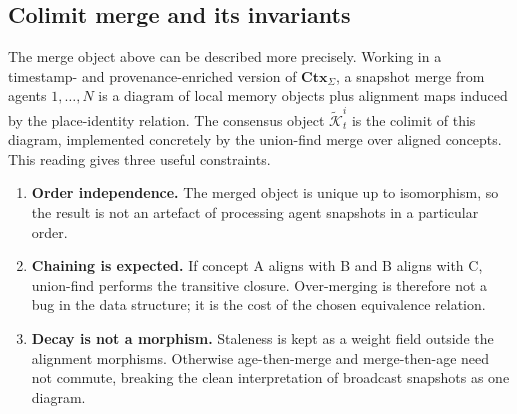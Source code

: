 \documentclass{article}
\begin{document}
\subsection{Colimit merge and its invariants}
\label{sec:colimit}

The merge object above can be described more precisely. Working in a
timestamp- and provenance-enriched version of $\mathbf{Ctx}_\Sigma$, a
snapshot merge from agents $1,\dots,N$ is a diagram of local memory
objects plus alignment maps induced by the place-identity relation. The
consensus object $\widetilde{\mathcal{K}}_t^i$ is the colimit of this
diagram, implemented concretely by the union-find merge over aligned
concepts. This reading gives three useful constraints.
\begin{enumerate}[leftmargin=20pt,itemsep=2pt,topsep=2pt]
\item \textbf{Order independence.} The merged object is unique up to isomorphism, so the result is not an artefact of processing agent snapshots in a particular order.
\item \textbf{Chaining is expected.} If concept A aligns with B and B aligns with C, union-find performs the transitive closure. Over-merging is therefore not a bug in the data structure; it is the cost of the chosen equivalence relation.
\item \textbf{Decay is not a morphism.} Staleness is kept as a weight field outside the alignment morphisms. Otherwise age-then-merge and merge-then-age need not commute, breaking the clean interpretation of broadcast snapshots as one diagram.
\end{enumerate}
\end{document}
